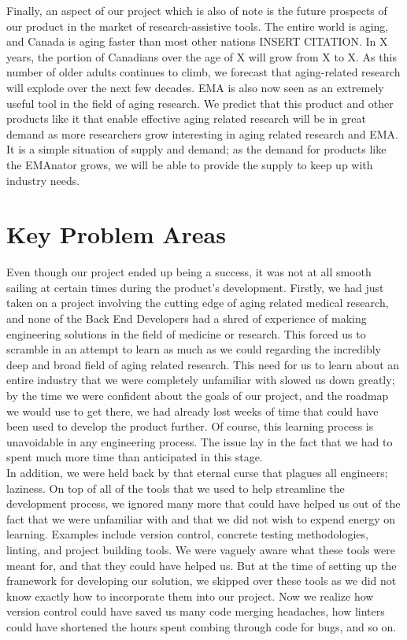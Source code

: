 \documentclass{article}
\begin{document}
Finally, an aspect of our project which is also of note is the future prospects of our product in the market of research-assistive tools. The entire world is aging, and Canada is aging faster than most other nations INSERT CITATION. In X years, the portion of Canadians over the age of X will grow from X to X. As this number of older adults continues to climb, we forecast that aging-related research will explode over the next few decades. EMA is also now seen as an extremely useful tool in the field of aging research. We predict that this product and other products like it that enable effective aging related research will be in great demand as more researchers grow interesting in aging related research and EMA. It is a simple situation of supply and demand; as the demand for products like the EMAnator grows, we will be able to provide the supply to keep up with industry needs.\\

\section{Key Problem Areas}

Even though our project ended up being a success, it was not at all smooth sailing at certain times during the product's development. Firstly, we had just taken on a project involving the cutting edge of aging related medical research, and none of the Back End Developers had a shred of experience of making engineering solutions in the field of medicine or research. This forced us to scramble in an attempt to learn as much as we could regarding the incredibly deep and broad field of aging related research. This need for us to learn about an entire industry that we were completely unfamiliar with slowed us down greatly; by the time we were confident about the goals of our project, and the roadmap we would use to get there, we had already lost weeks of time that could have been used to develop the product further. Of course, this learning process is unavoidable in any engineering process. The issue lay in the fact that we had to spent much more time than anticipated in this stage.\\

In addition, we were held back by that eternal curse that plagues all engineers; laziness. On top of all of the tools that we used to help streamline the development process, we ignored many more that could have helped us out of the fact that we were unfamiliar with and that we did not wish to expend energy on learning. Examples include version control, concrete testing methodologies, linting, and project building tools. We were vaguely aware what these tools were meant for, and that they could have helped us. But at the time of setting up the framework for developing our solution, we skipped over these tools as we did not know exactly how to incorporate them into our project. Now we realize how version control could have saved us many code merging headaches, how linters could have shortened the hours spent combing through code for bugs, and so on.\\
\end{document}
